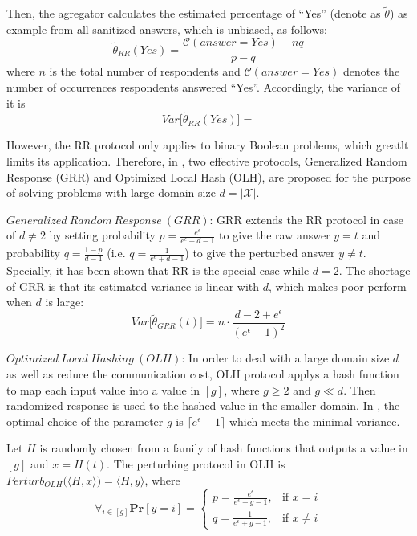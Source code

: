 \documentclass[conference]{IEEEtran}
\begin{document}
Then, the agregator calculates the estimated percentage of ``Yes'' (denote as $\tilde{\theta}$) as example  from all sanitized answers, which is unbiased, as follows: 
$$\tilde{\theta}_{RR}(Yes) = \frac{\mathcal{C}(answer=Yes) - nq}{p-q}$$
where $n$ is the total number of respondents and $\mathcal{C}(answer=Yes)$ denotes the number of occurrences respondents answered ``Yes''. Accordingly, the variance of it is 
{\color{red}$$Var \big[\tilde{\theta}_{RR}(Yes) \big] = $$}

However, the RR protocol only applies to binary Boolean problems, which greatlt limits its application. Therefore, in \cite{a8}, two effective protocols, Generalized Random Response (GRR) and Optimized Local Hash (OLH), are proposed for the purpose of solving problems with large domain size $d = |\mathcal{X}|$.

$Generalized\ Random\ Response\ (GRR)$\cite{a8}: GRR extends the RR protocol in case of $d \neq 2$ by setting probability $p = \frac{e^{\epsilon}}{e^{\epsilon} + d - 1}$ to give the raw answer $y = t$ and probability $q = \frac{1-p}{d-1}$ (i.e. $q =\frac{1}{e^{\epsilon} + d - 1}$) to give the perturbed answer $y \neq t$. Specially, it has been shown that RR is the special case while $d = 2$. The shortage of GRR is that its estimated variance is linear with $d$, which makes poor perform when $d$ is large: 
\begin{equation}
Var\big[\tilde{\theta}_{GRR}(t)\big] = n \cdot \frac{d - 2+e^{\epsilon}}{(e^{\epsilon}-1)^2} 
\label{grr variance}
\end{equation}


$Optimized\ Local\ Hashing\ (OLH)$\cite{a8}: In order to deal with a large domain size $d$ as well as reduce the communication cost, OLH protocol applys a hash function to map each input value into a value in $[g]$, where $g \geq 2$ and $g \ll d$. Then randomized response is used to the hashed value in the smaller domain. In \cite{a8}, the optimal choice of the parameter $g$ is $\lceil e^{\epsilon}+1 \rceil$ which meets the minimal variance.

Let $H$ is randomly chosen from a family of hash functions that outputs a value in $[g]$ and $x = H(t)$. The perturbing protocol in OLH is $Perturb_{OLH} \big(\langle H,x \rangle \big) = \langle H,y \rangle$, where
$$\forall_{i\in [g]} \mathbf{Pr} [y=i] = 
\begin{cases}
p = \frac{e^{\epsilon}}{e^{\epsilon}+g-1},&\text{if $x=i$} \\
q = \frac{1}{e^{\epsilon}+g-1},&\text{if $x\neq i$}
\end{cases}
$$
\end{document}
